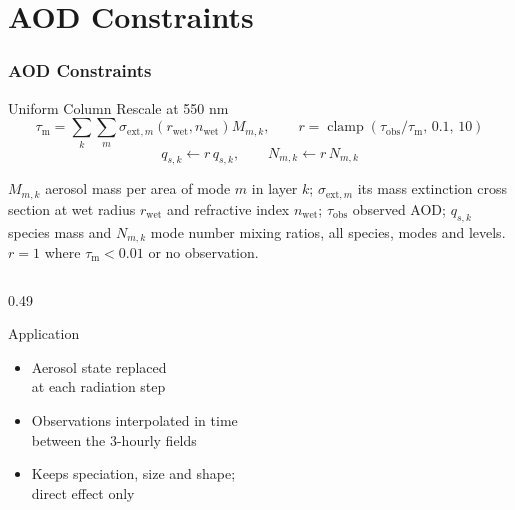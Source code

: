 \section{AOD Constraints}
\begin{frame}[t]
\frametitle{AOD Constraints}
\footnotesize
\begin{block}{Uniform Column Rescale at 550 nm}
\vspace{-0.6em}
\[
  \tau_{\mathrm{m}} = \sum_{k}\sum_{m}
      \sigma_{\mathrm{ext},m}\!\left(r_{\mathrm{wet}}, n_{\mathrm{wet}}\right) M_{m,k},
  \qquad
  r = \operatorname{clamp}\!\left(\tau_{\mathrm{obs}}/\tau_{\mathrm{m}},\, 0.1,\, 10\right)
\]
\vspace{-1.4em}
\[
  q_{s,k} \leftarrow r\, q_{s,k}, \qquad N_{m,k} \leftarrow r\, N_{m,k}
\]
{\scriptsize\raggedright
$M_{m,k}$ aerosol mass per area of mode $m$ in layer $k$;
$\sigma_{\mathrm{ext},m}$ its mass extinction cross section at wet radius $r_{\mathrm{wet}}$ and refractive index $n_{\mathrm{wet}}$;
$\tau_{\mathrm{obs}}$ observed AOD;
$q_{s,k}$ species mass and $N_{m,k}$ mode number mixing ratios, all species, modes and levels.
$r = 1$ where $\tau_{\mathrm{m}} < 0.01$ or no observation.\par}
\vspace{-0.3em}
\end{block}
\begin{columns}[T]
\begin{column}{0.49\textwidth}
\begin{block}{Application}
\begin{itemize}
  \item Aerosol state replaced\\at each radiation step
  \item Observations interpolated in time\\between the 3-hourly fields
  \item Keeps speciation, size and shape;\\direct effect only
\end{itemize}
\end{block}

\end{column}
\end{columns}
\end{frame}
